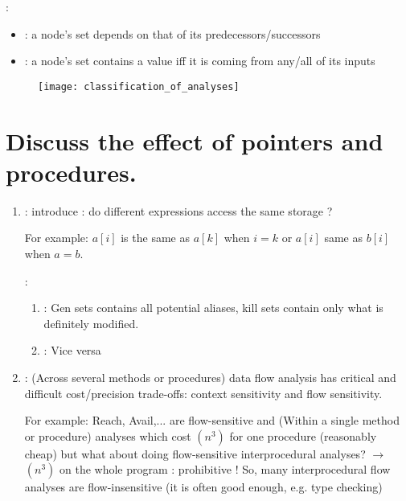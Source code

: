 :
\begin{itemize}
    \item {} : a node’s set depends on that of its predecessors/successors
    \item {} : a node’s set contains a value iff it is coming from any/all of its inputs
\end{itemize}

\begin{figure}[H]
    \centering
    \texttt{[image: classification\_of\_analyses]}
\end{figure}

\section{Discuss the effect of pointers and procedures.}

\begin{enumerate}
    \item {} : introduce  : do different expressions access the same storage ?
    
    For example: $a[i]$ is the same as $a[k]$ when $i=k$ or $a[i]$ same as $b[i]$ when $a=b$. 
    
    : 
    \begin{enumerate}
        \item {} : Gen sets contains all potential aliases, kill sets contain only what is definitely modified.
        \item {} : Vice versa
    \end{enumerate}
    \item {} :  (Across several methods or procedures) data flow analysis has critical and difficult cost/precision trade-offs: context sensitivity and flow sensitivity.
    
    For example: Reach, Avail,... are flow-sensitive and  (Within a single method or procedure) analyses which cost \bigO$(n^3)$ for one procedure (reasonably cheap) but what about doing flow-sensitive interprocedural analyses? $\rightarrow$ \bigO$(n^3)$ on the whole program : prohibitive ! So, many interprocedural flow analyses are flow-insensitive (it is often good enough, e.g. type checking)
\end{enumerate}

